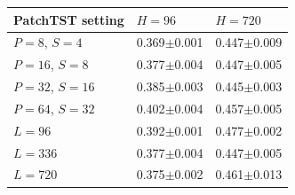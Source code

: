 \begin{tabular}{@{}lll@{}}
\toprule
PatchTST setting & $H{=}96$ & $H{=}720$ \\
\midrule
$P{=}8$, $S{=}4$ & 0.369$\pm$0.001 & 0.447$\pm$0.009 \\
$P{=}16$, $S{=}8$ & 0.377$\pm$0.004 & 0.447$\pm$0.005 \\
$P{=}32$, $S{=}16$ & 0.385$\pm$0.003 & 0.445$\pm$0.003 \\
$P{=}64$, $S{=}32$ & 0.402$\pm$0.004 & 0.457$\pm$0.005 \\
\midrule
$L{=}96$ & 0.392$\pm$0.001 & 0.477$\pm$0.002 \\
$L{=}336$ & 0.377$\pm$0.004 & 0.447$\pm$0.005 \\
$L{=}720$ & 0.375$\pm$0.002 & 0.461$\pm$0.013 \\
\bottomrule
\end{tabular}